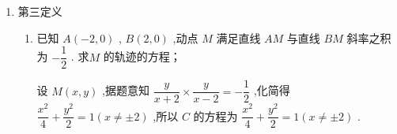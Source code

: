 \begin{enumerate}
\begin{enumerate}
        \item 已知椭圆的焦点分别为 ${F}_{1}\left( {-4,0}\right) \text{ 、 }{F}_{2}\left( {4,0}\right)$ ,过点 ${F}_{2}$ 并垂直于 $x$ 轴的直线与椭圆的一个交点为 $B$ ,且 $\left| {{F}_{1}B}\right|  + \left| {{F}_{2}B}\right|  = {10}$ . 椭圆上不同的两点 $A\left( {{x}_{1},{y}_{1}}\right) \text{ 、 }C\left( {{x}_{2},{y}_{2}}\right)$ 满足条件: $\left| {{F}_{2}A}\right| \text{ 、 }\left| {{F}_{2}B}\right| \text{ 、 }\left| {{F}_{2}C}\right|$ 成等差数列.
        \begin{jieda}
            \begin{enumerate}
                \item 设椭圆的标准方程为$\dfrac{x^2}{a^2}+\dfrac{y^2}{b^2} = 1$，根据定义可知$2a = 10, a= 5$，$c = 4$，故$b = 3$，所以椭圆的标准方程$\dfrac{x^2}{25}+\dfrac{y^2}{9} = 1$
                \item 根据题意可知$|F_2B| = \dfrac{9}{5}$，因此$|F_2A| + |F_2C| = \dfrac{18}{5}$，根据椭圆第二定义可知$|F_2A| + |F_2C| = (a-ex_1)+(a-ex_2) = 2a-e(x_1+x_2) = 10 - \dfrac{4}{5}(x_1+x_2) = \dfrac{18}{5}$，因此$x_1+x_2 = 8$，故弦$AC$中点的横坐标为$4$
                \item $\dfrac{(x_1+x_2)(x_1-x_2)}{25}+\dfrac{(y_1+y_2)(y_1-y_2)}{9} = 0$

                设$AC$中点纵坐标为$y_0$，则$k_{AC} = \dfrac{y_1-y_2}{x_1-x_2} = \dfrac{x_1+x_2}{y_1+y_2} \cdot \left(-\dfrac{9}{25}\right) = -\dfrac{36}{25} \cdot \dfrac{1}{y_0}$

                故弦 ${AC}$ 垂直平分线为$y = \dfrac{25}{36}y_0(x-4)+y_0$，故$m = -\dfrac{16}{9}y_0$，而弦中点纵坐标$y_0 \in \left(-\dfrac{9}{5}, \dfrac{9}{5}\right)$，故$m \in \left(-\dfrac{16}{5}, \dfrac{16}{5}\right)$
            \end{enumerate}
        \end{jieda}
    \end{enumerate}

    
    \item 第三定义
    \begin{enumerate}
        \item 已知 $A\left( {-2,0}\right)$ , $B\left( {2,0}\right)$ ,动点 $M$ 满足直线 ${AM}$ 与直线 ${BM}$ 斜率之积为 $- \dfrac{1}{2}$ . 求$M$ 的轨迹的方程；
        \begin{jieda}
            设 $M\left( {x,y}\right)$ ,据题意知 $\dfrac{y}{x + 2} \times  \dfrac{y}{x - 2} =  - \dfrac{1}{2}$ ,化简得 $\dfrac{{x}^{2}}{4} + \dfrac{{y}^{2}}{2} = 1\left( {x \neq   \pm  2}\right)$ ,所以 $C$ 的方程为 $\dfrac{{x}^{2}}{4} + \dfrac{{y}^{2}}{2} = 1\left( {x \neq   \pm  2}\right)$ .
        \end{jieda}
        

\end{enumerate}
\end{enumerate}

